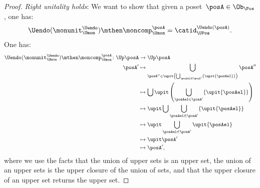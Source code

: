 \begin{proof}
	\emph{Right unitality holds}: We want to show that given a poset~$\posA\in \Ob_\Pos$, one has:
	\begin{equation}
		\Uendo(\monunit_{\Umon}^{\Uendo})\mthen \moncomp_{\Umon}^{\posA}=\catid_{\UPos}^{\Uendo(\posA)}.
	\end{equation}
	One has:
	\begin{equation*}
		\begin{aligned}
			\Uendo(\monunit_{\Umon}^{\Uendo})\mthen \moncomp_{\Umon}^{\posA}\colon \Up \posA & \to \Up \posA                                                                                              \\
			\posA'                                                                           & \mapsto \bigcup_{\posA''\in \upit \left( \bigcup_{\posAel \in \posA'}\{ \upit \{\posAel\}\}\right)}\posA'' \\
			                                                                                 & \mapsto \bigcup \upit \left( \bigcup_{\posAel \in \posA'}\{\upit \{ \posAel\} \}\right)                    \\
			                                                                                 & \mapsto \upit \bigcup   \bigcup_{\posAel \in \posA'}\{\upit \{ \posAel\} \}                                \\
			                                                                                 & \mapsto \upit \bigcup_{\posAel \in \posA'}\upit \{ \posAel\}                                               \\
			                                                                                 & \mapsto \upit \posA'                                                                                       \\
			                                                                                 & \mapsto \posA',
		\end{aligned}
	\end{equation*}
	where we use the facts that the union of upper sets is an upper set, the union of an upper sets is the upper closure of the union of sets, and that the upper closure of an upper set returns the upper set.


\end{proof}
